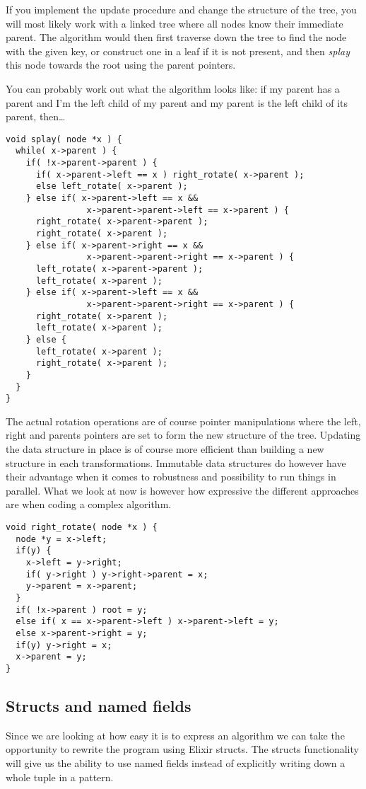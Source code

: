 \documentclass[a4paper,11pt]{article}
\begin{document}
If you implement the update procedure and change the structure of the
tree, you will most likely work with a linked tree where all nodes
know their immediate parent. The algorithm would then first traverse
down the tree to find the node with the given key, or construct one in
a leaf if it is not present, and then {\em splay} this node towards
the root using the parent pointers. 

You can probably work out what the algorithm looks like: if my parent
has a parent and I'm the left child of my parent and my parent is the
left child of its parent, then\ldots

\begin{verbatim}
void splay( node *x ) {
  while( x->parent ) {
    if( !x->parent->parent ) {
      if( x->parent->left == x ) right_rotate( x->parent );
      else left_rotate( x->parent );
    } else if( x->parent->left == x && 
                x->parent->parent->left == x->parent ) {
      right_rotate( x->parent->parent );
      right_rotate( x->parent );
    } else if( x->parent->right == x && 
                x->parent->parent->right == x->parent ) {
      left_rotate( x->parent->parent );
      left_rotate( x->parent );
    } else if( x->parent->left == x && 
                x->parent->parent->right == x->parent ) {
      right_rotate( x->parent );
      left_rotate( x->parent );
    } else {
      left_rotate( x->parent );
      right_rotate( x->parent );
    }
  }
}
\end{verbatim}

The actual rotation operations are of course pointer manipulations
where the left, right and parents pointers are set to form the new
structure of the tree. Updating the data structure in place is of
course more efficient than building a new structure in each
transformations. Immutable data structures do however have their
advantage when it comes to robustness and possibility to run things in
parallel. What we look at now is however how expressive the different
approaches are when coding a complex algorithm.

\begin{verbatim}
void right_rotate( node *x ) {
  node *y = x->left;
  if(y) {
    x->left = y->right;
    if( y->right ) y->right->parent = x;
    y->parent = x->parent;
  }
  if( !x->parent ) root = y;
  else if( x == x->parent->left ) x->parent->left = y;
  else x->parent->right = y;
  if(y) y->right = x;
  x->parent = y;
}
\end{verbatim}

\subsection{Structs and named fields}
Since we are looking at how easy it is to express an algorithm we can
take the opportunity to rewrite the program using Elixir structs. The
structs functionality will give us the ability to use named fields
instead of explicitly writing down a whole tuple in a pattern.
\end{document}
